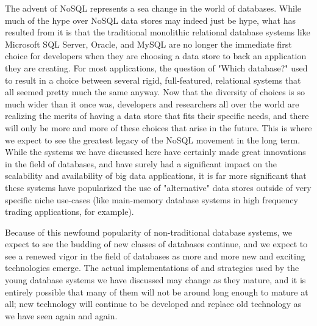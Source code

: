 \documentclass[11pt,a4paper]{report}
\begin{document}
The advent of NoSQL represents a sea change in the world of databases. While much of the hype over NoSQL data stores may indeed just be hype, what has resulted from it is that the traditional monolithic relational database systems like Microsoft SQL Server, Oracle, and MySQL are no longer the immediate first choice for developers when they are choosing a data store to back an application they are creating. For most applications, the question of "Which database?" used to result in a choice between several rigid, full-featured, relational systems that all seemed pretty much the same anyway. Now that the diversity of choices is so much wider than it once was, developers and researchers all over the world are realizing the merits of having a data store that fits their specific needs, and there will only be more and more of these choices that arise in the future. This is where we expect to see the greatest legacy of the NoSQL movement in the long term. While the systems we have discussed here have certainly made great innovations in the field of databases, and have surely had a significant impact on the scalability and availability of big data applications, it is far more significant that these systems have popularized the use of "alternative" data stores outside of very specific niche use-cases (like main-memory database systems in high frequency trading applications, for example).

Because of this newfound popularity of non-traditional database systems, we expect to see the budding of new classes of databases continue, and we expect to see a renewed vigor in the field of databases as more and more new and exciting technologies emerge. The actual implementations of and strategies used by the young database systems we have discussed may change as they mature, and it is entirely possible that many of them will not be around long enough to mature at all; new technology will continue to be developed and replace old technology as we have seen again and again.



\pagebreak


\end{document}
